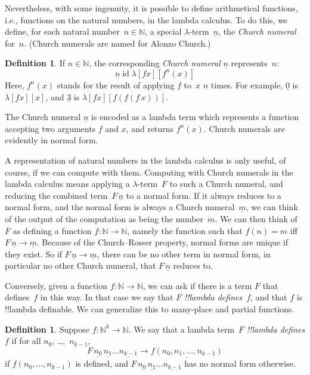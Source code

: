 \documentclass[10pt,a4paper]{article}
\theoremstyle{plain}
\theoremstyle{definition}
\newtheorem{defn}[thm]{Definition}
\theoremstyle{remark}
\providecommand{\num}[1]{\underline{#1}}
\providecommand{\Nat}{\ensuremath{\mathbb{N}}}
\providecommand{\lambd}{\ensuremath{\lambda}}
\providecommand{\ident}{\operatorname{id}}
\providecommand{\red}{\mathrel{\rightarrow}}
\providecommand{\red}{\mathrel{\rightarrow}}
\begin{document}
Nevertheless, with some ingenuity, it is possible to define
arithmetical functions, i.e., functions on the natural numbers, in the
lambda calculus. To do this, we define, for each natural number~$n \in
\Nat$, a special $\lambd$-term~$\num n$, the \emph{Church numeral}
for~$n$. (Church numerals are named for Alonzo Church.)

\begin{defn}
  If $n \in \Nat$, the corresponding \emph{Church numeral} $\num{n}$
  represents~$n$:
  \[
    \num{n} \ident \lambd[fx][f^n(x)]
  \]
  Here, $f^n(x)$ stands for the result of applying $f$ to~$x$ $n$
  times. For example, $\num{0}$ is $\lambd[fx][x]$, and $\num{3}$ is
  $\lambd[fx][f(f(f\,x))]$.
\end{defn}
  
The Church numeral $\num n$ is encoded as a lambda term which
represents a function accepting two arguments $f$ and $x$, and
returns $f^n(x)$. Church numerals are evidently in normal form.

A representation of natural numbers in the lambda calculus is only
useful, of course, if we can compute with them.  Computing with Church
numerals in the lambda calculus means applying a $\lambd$-term~$F$ to
such a Church numeral, and reducing the combined term~$F\, \num n$ to
a normal form. If it always reduces to a normal form, and the normal
form is always a Church numeral~$\num m$, we can think of the output
of the computation as being the number~$m$. We can then think of~$F$
as defining a function $f\colon \Nat \to \Nat$, namely the function
such that $f(n) = m$ iff $F\, \num n \red \num m$. Because of the
Church--Rosser property, normal forms are unique if they exist. So if
$F\, \num n \red \num m$, there can be no other term in normal form,
in particular no other Church numeral, that $F \, \num n$ reduces to.

Conversely, given a function $f\colon \Nat \to \Nat$,
we can ask if there is a term $F$ that defines~$f$ in this way. In
that case we say that $F$ \emph{!!{lambda define}s}~$f$, and that $f$ is
!!{lambda definable}. We can generalize this to many-place and partial
functions.

\begin{defn}
Suppose $f\colon \Nat^k \to \Nat$. We say that a lambda term~$F$
\emph{!!{lambda define}s} $f$ if for all 
$n_0$, \dots,~$n_{k-1}$,
\[
F \, \num{n_0} \, \num{n_1} \dots \num{n_{k-1}} \red \num{f(n_0, n_1, \dots,
  n_{k-1})}
\]
if $f(n_0, \dots, n_{k-1})$ is defined, and $F \, \num{n_0} \,
\num{n_1} \dots \num{n_{k-1}}$ has no normal form otherwise.
\end{defn}
\end{document}
